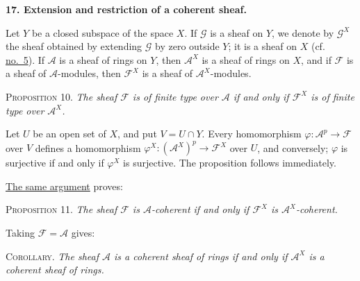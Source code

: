 
\medskip
{}\label{fac:I:2:no:17}
\textbf{17. Extension and restriction of a coherent sheaf.}

Let $Y$ be a closed subspace of the space $X$. If $\mathcal{G}$ is a sheaf on $Y$, we denote by $\mathcal{G}^X$ the sheaf obtained by extending $\mathcal{G}$ by zero outside $Y$; it is a sheaf on $X$ (cf. \hyperref[fac:I:1:no:5]{no.~5}). If $\mathcal{A}$ is a sheaf of rings on $Y$, then $\mathcal{A}^X$ is a sheaf of rings on $X$, and if $\mathcal{F}$ is a sheaf of $\mathcal{A}$-modules, then $\mathcal{F}^X$ is a sheaf of $\mathcal{A}^X$-modules.

\label{fac:I:2:no:17:prop:10}
\textsc{Proposition 10.} \textit{The sheaf $\mathcal{F}$ is of finite type over $\mathcal{A}$ if and only if $\mathcal{F}^X$ is of finite type over $\mathcal{A}^X$.}

\label{fac:I:2:no:17:prop:10:proof}
Let $U$ be an open set of $X$, and put $V=U\cap Y$. Every homomorphism $\varphi:\mathcal{A}^p\to\mathcal{F}$ over $V$ defines a homomorphism $\varphi^X:(\mathcal{A}^X)^p\to\mathcal{F}^X$ over $U$, and conversely; $\varphi$ is surjective if and only if $\varphi^X$ is surjective. The proposition follows immediately.

\hyperref[fac:I:2:no:17:prop:10:proof]{The same argument} proves:

\label{fac:I:2:no:17:prop:11}
\textsc{Proposition 11.} \textit{The sheaf $\mathcal{F}$ is $\mathcal{A}$-coherent if and only if $\mathcal{F}^X$ is $\mathcal{A}^X$-coherent.}

Taking $\mathcal{F}=\mathcal{A}$ gives:

\label{fac:I:2:no:17:prop:11:cor}
\textsc{Corollary.} \textit{The sheaf $\mathcal{A}$ is a coherent sheaf of rings if and only if $\mathcal{A}^X$ is a coherent sheaf of rings.}
